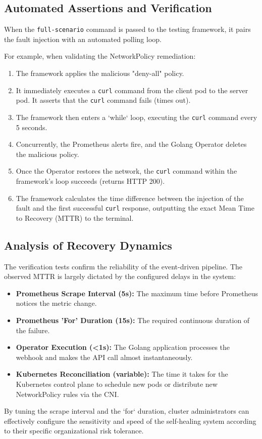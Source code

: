 \documentclass[12pt,a4paper]{article}
\begin{document}
\subsection{Automated Assertions and Verification}
When the \texttt{full-scenario} command is passed to the testing framework, it pairs the fault injection with an automated polling loop.

For example, when validating the NetworkPolicy remediation:
\begin{enumerate}
    \item The framework applies the malicious "deny-all" policy.
    \item It immediately executes a \texttt{curl} command from the client pod to the server pod. It asserts that the \texttt{curl} command fails (times out).
    \item The framework then enters a `while` loop, executing the \texttt{curl} command every 5 seconds.
    \item Concurrently, the Prometheus alerts fire, and the Golang Operator deletes the malicious policy.
    \item Once the Operator restores the network, the \texttt{curl} command within the framework's loop succeeds (returns HTTP 200).
    \item The framework calculates the time difference between the injection of the fault and the first successful \texttt{curl} response, outputting the exact Mean Time to Recovery (MTTR) to the terminal.
\end{enumerate}

\subsection{Analysis of Recovery Dynamics}
The verification tests confirm the reliability of the event-driven pipeline. The observed MTTR is largely dictated by the configured delays in the system:
\begin{itemize}
    \item \textbf{Prometheus Scrape Interval (5s):} The maximum time before Prometheus notices the metric change.
    \item \textbf{Prometheus 'For' Duration (15s):} The required continuous duration of the failure.
    \item \textbf{Operator Execution (<1s):} The Golang application processes the webhook and makes the API call almost instantaneously.
    \item \textbf{Kubernetes Reconciliation (variable):} The time it takes for the Kubernetes control plane to schedule new pods or distribute new NetworkPolicy rules via the CNI.
\end{itemize}
By tuning the scrape interval and the `for` duration, cluster administrators can effectively configure the sensitivity and speed of the self-healing system according to their specific organizational risk tolerance.
\end{document}
